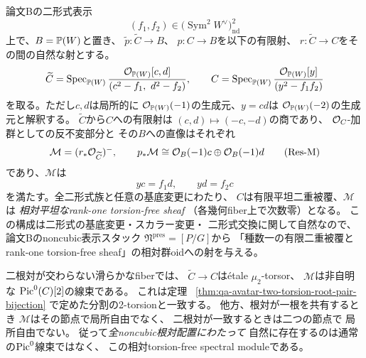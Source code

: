 \begin{theorem}
\label{thm:qa-noncubic-rootpair-torsionfree-spectral-module}
論文Bの二形式表示
\[
 (f_1,f_2)\in
 \bigl(\operatorname{Sym}^2W^\vee\bigr)_{\mathrm{nd}}^2
\]
上で、$B=\mathbb P(W)$と置き、
$\widetilde p:\widetilde C\to B$、
$p:C\to B$を以下の有限射、
$r:\widetilde C\to C$をその間の自然な射とする。
\[
 \widetilde C=
 \operatorname{Spec}_{\mathbb P(W)}
  \frac{\mathcal O_{\mathbb P(W)}[c,d]}
       {(c^2-f_1,\ d^2-f_2)},\qquad
 C=\operatorname{Spec}_{\mathbb P(W)}
  \frac{\mathcal O_{\mathbb P(W)}[y]}{(y^2-f_1f_2)}
\]
を取る。ただし$c,d$は局所的に
$\mathcal O_{\mathbb P(W)}(-1)$の生成元、$y=cd$は
$\mathcal O_{\mathbb P(W)}(-2)$の生成元と解釈する。
$\widetilde C$から$C$への有限射は
$(c,d)\mapsto(-c,-d)$の商であり、
$\mathcal O_C$-加群としての反不変部分と
その$B$への直像はそれぞれ
\[
 \mathcal M=(r_*\mathcal O_{\widetilde C})^-,
 \qquad
 p_*\mathcal M
 \cong\mathcal O_B(-1)c\oplus\mathcal O_B(-1)d
 \tag{Res-M}\label{eq:qa-rootpair-spectral-module}
\]
であり、$\mathcal M$は
\[
 y c=f_1 d,\qquad y d=f_2 c
 \tag{Res-MF}\label{eq:qa-rootpair-spectral-matrix-factorization}
\]
を満たす。全二形式族と任意の基底変更にわたり、
$C$は有限平坦二重被覆、$\mathcal M$は
\emph{相対平坦なrank-one torsion-free sheaf}
（各幾何fiber上で次数零）となる。
この構成は二形式の基底変更・スカラー変更・
二形式交換に関して自然なので、
論文Bのnoncubic表示スタック
$\mathfrak N^{\mathrm{pres}}=[P/G]$から
「種数一の有限二重被覆とrank-one
torsion-free sheaf」の相対群oidへの射を与える。

二根対が交わらない滑らかなfiberでは、
$\widetilde C\to C$はétale $\mu_2$-torsor、
$\mathcal M$は非自明な
$\operatorname{Pic}^0(C)[2]$の線束である。
これは定理
~\ref{thm:qa-avatar-two-torsion-root-pair-bijection}
で定めた分割の2-torsionと一致する。
他方、根対が一根を共有するとき
$\mathcal M$はその節点で局所自由でなく、
二根対が一致するときは二つの節点で
局所自由でない。
従って\emph{全noncubic根対配置にわたって}
自然に存在するのは通常の$\operatorname{Pic}^0$線束ではなく、
この相対torsion-free spectral moduleである。
\end{theorem}
